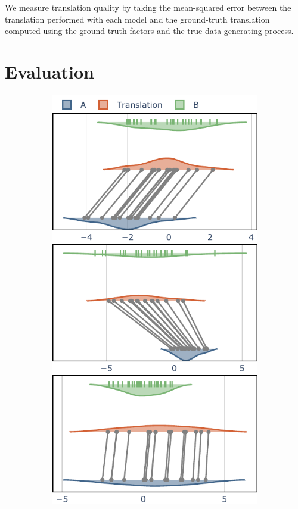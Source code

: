 \documentclass[nohyperref]{article}
\theoremstyle{plain}
\theoremstyle{definition}
\theoremstyle{remark}
\begin{document}
We measure translation quality by taking the mean-squared error between the translation performed with each model and the ground-truth translation computed using the ground-truth factors and the true data-generating process.

\section{Evaluation}

\begin{figure}[ht]
    \vskip 0.2in
    \begin{center}
\begin{subfigure}{0.49\columnwidth}
    \includegraphics[width=\textwidth]{files/data_trans.pdf}

\end{subfigure}
\end{center}
\end{figure}
\end{document}
